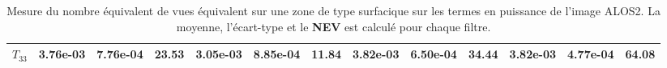 \begin{table}[!htbp]
\begin{tabular}{c|c|c|c|c|c|c|c|c|c|c|c|c|}
\multicolumn{1}{|c|}{\textbf{$T_{33}$}} & 3.76e-03                      & 7.76e-04                         & \textbf{23.53}                & 3.05e-03                          & 8.85e-04                            & 11.84                            & 3.82e-03                            & 6.50e-04                               & \textbf{34.44}                      & 3.82e-03                         & 4.77e-04                            & \textbf{64.08}                  \\ \hline
\end{tabular}
\caption{\small{Mesure du nombre équivalent de vues équivalent sur une zone de type surfacique sur les termes en puissance de l'image ALOS2.  La moyenne, l'écart-type et le \textbf{NEV} est calculé pour chaque filtre.}}
\label{tab:alos2_results_table}
\end{table}


